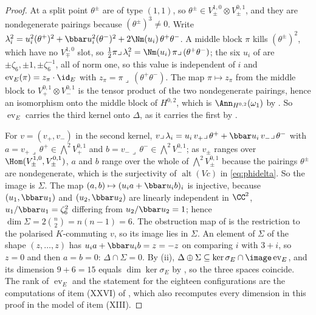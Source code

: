 \begin{proof}
At a split point $\theta^{\pm}$ are of type $(1,1)$, so $\theta^{\pm}\in
V_{\pm}^{1,0}\otimes V_{\pm}^{0,1}$, and they are nondegenerate pairings
because $(\theta^{\pm})^{3}\ne0$. Write $\lambda_{i}^{2}=u_{i}^{2}(\theta^{+})^{2}
+\bbar u_{i}^{2}(\theta^{-})^{2}+2\Nm(u_{i})\,\theta^{+}\theta^{-}$. A middle
block $\pi$ kills $(\theta^{\pm})^{2}$, which have no $V_{\mp}^{1,0}$ slot, so
$\tfrac12\pi\lrcorner\,\lambda_{i}^{2}=\Nm(u_{i})\,\pi\lrcorner\,(\theta^{+}\theta^{-})$;
the six $u_{i}$ of  are $\pm\zeta_{6},\pm1,
\pm\zeta_{6}^{-1}$, all of norm one, so this value is independent of $i$ and
$\operatorname{ev}_{E}(\pi)=z_{\pi}\cdot\id_{E}$ with
$z_{\pi}=\pi\lrcorner\,(\theta^{+}\theta^{-})$. The map $\pi\mapsto z_{\pi}$
from the middle block to $V_{+}^{0,1}\otimes V_{-}^{0,1}$ is the tensor
product of the two nondegenerate pairings, hence an isomorphism onto the
middle block of $H^{0,2}$, which is $\Ann_{H^{0,2}}(\omega_{1})$ by
. So $\operatorname{ev}_{E}$ carries the third kernel
onto $\Delta$, as it carries the first by .

For $v=(v_{+},v_{-})$ in the second kernel,
$v\lrcorner\,\lambda_{i}=u_{i}\,v_{+}\lrcorner\,\theta^{+}+\bbar u_{i}\,
v_{-}\lrcorner\,\theta^{-}$ with $a=v_{+}\lrcorner\,\theta^{+}\in
\bigwedge^{2}V_{+}^{0,1}$ and $b=v_{-}\lrcorner\,\theta^{-}\in\bigwedge^{2}V_{-}^{0,1}$;
as $v_{\pm}$ ranges over $\Hom(V_{\pm}^{1,0},V_{\pm}^{0,1})$, $a$ and $b$
range over the whole of $\bigwedge^{2}V_{\pm}^{0,1}$ because the pairings
$\theta^{\pm}$ are nondegenerate, which is the surjectivity of
$\operatorname{alt}(Vc)$ in \eqref{eq:phidelta}. So the image is $\Sigma$.
The map $(a,b)\mapsto(u_{i}a+\bbar u_{i}b)_{i}$ is injective, because
$(u_{1},\bbar u_{1})$ and $(u_{2},\bbar u_{2})$ are linearly independent in
$\CC^{2}$, $u_{1}/\bbar u_{1}=\zeta_{6}^{2}$ differing from
$u_{2}/\bbar u_{2}=1$; hence $\dim\Sigma=2\binom{n}{2}=n(n-1)=6$. The
obstruction map of  is the restriction to the
polarised $K$-commuting $v$, so its image lies in $\Sigma$. An element of
$\Sigma$ of the shape $(z,\dots,z)$ has $u_{i}a+\bbar u_{i}b=z=-z$ on
comparing $i$ with $3+i$, so $z=0$ and then $a=b=0$: $\Delta\cap\Sigma=0$.
By (ii), $\Delta\oplus\Sigma\subseteq\ker\sigma_{E}\cap\image\operatorname{ev}_{E}$,
and its dimension $9+6=15$ equals $\dim\ker\sigma_{E}$ by
, so the three spaces coincide. The rank of
$\operatorname{ev}_{E}$ and the statement for the eighteen configurations
are the computations of item (XXVI) of , which also
recomputes every dimension in this proof in the model of item (XIII).
\end{proof}


